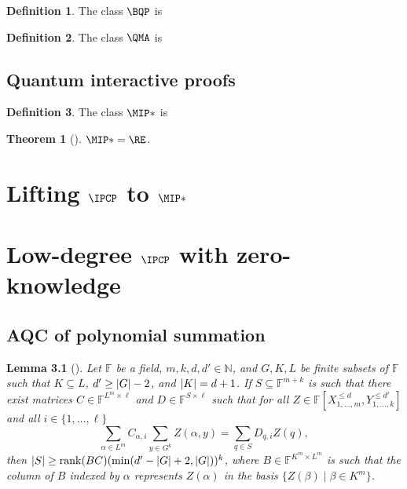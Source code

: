 \documentclass[english]{reedthesis}
\theoremstyle{plain}
\newtheorem{thm}{Theorem}[section]
\newtheorem{lemma}[lemma]{Lemma}
\theoremstyle{definition}
\newtheorem{defn}[defn]{Definition}
\theoremstyle{remark}
\DeclareMathOperator{\rk}{rank}
\DeclarePairedDelimiter{\abs}{\lvert}{\rvert}
\begin{document}
\begin{defn}\label{def:bqp}
  The class $\BQP$ is
\end{defn}

\begin{defn}\label{def:qma}
  The class $\QMA$ is
\end{defn}

\section{Quantum interactive proofs}\label{sec:quant-interactive}

\begin{defn}\label{def:mip-star}
  The class $\MIP*$ is
\end{defn}

\begin{thm}[{\cite{JNVWY21}}]\label{thm:mip-star-is-re}
  $\MIP* = \RE$.
\end{thm}

\chapter{Lifting $\IPCP$ to $\MIP*$}\label{chap:ipcp-to-mip}

\chapter{Low-degree $\IPCP$ with zero-knowledge}\label{chap:ipcp-zero-knowledge}

\section{AQC of polynomial summation}\label{sec:aqc-poly-sum}

\begin{lemma}[{\cite[Lemma 12.1]{CFGS22}}]
  Let $\mathbb{F}$ be a field, $m, k, d, d' \in \mathbb{N}$, and $G, K, L$ be finite
  subsets of $\mathbb{F}$ such that $K \subseteq L$, $d' \ge \abs{G} - 2$, and
  $\abs{K} = d + 1$. If $S \subseteq \mathbb{F}^{m+k}$ is such that there exist matrices
  $C \in \mathbb{F}^{L^{m} \times \ell}$ and $D \in \mathbb{F}^{S \times \ell}$ such that for
  all $Z \in \mathbb{F}[X_{1, \ldots, m}^{\le d}, Y_{1, \ldots, k}^{\le d'}]$ and all
  $i \in \{1, \ldots, \ell\}$
  \begin{equation}
    \sum_{\alpha \in L^{m}}C_{\alpha,i}\sum_{y \in G^{k}}Z(\alpha, y) = \sum_{q \in S}D_{q,i}Z(q),
  \end{equation}
  then $\abs{S} \ge \rk(BC)(\min(d' - \abs{G} + 2, \abs{G}))^{k}$, where
  $B \in \mathbb{F}^{K^{m} \times L^{m}}$ is such that the column of $B$ indexed by $\alpha$
  represents $Z(\alpha)$ in the basis $\{Z(\beta) \mid \beta \in K^{m}\}$.
\end{lemma}
\end{document}
